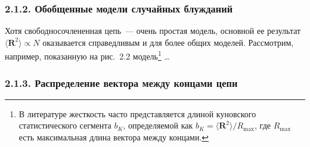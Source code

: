 \documentclass[12pt,a4paper]{article}
\begin{document}
\subsubsection*{2.1.2. Обобщенные модели случайных блужданий}

Хотя свободносочлененная цепь~--- очень простая модель, основной ее результат $\langle\boldsymbol{R}^2\rangle \propto N$ оказывается справедливым и для более общих моделей. Рассмотрим, например, показанную на рис.~2.2 модель\footnote{В литературе жесткость часто представляется длиной куновского статистического сегмента $b_K$, определяемой как $b_K = \langle\boldsymbol{R}^2\rangle / R_{\max}$, где $R_{\max}$ есть максимальная длина вектора между концами.} \dots

\subsubsection*{2.1.3. Распределение вектора между концами цепи}
\end{document}
